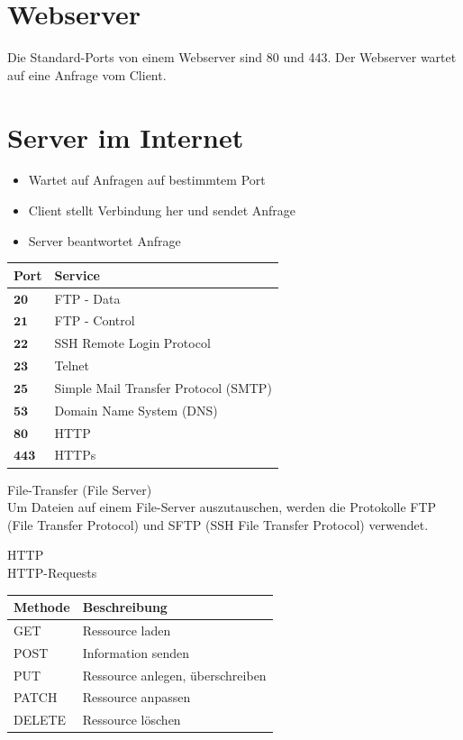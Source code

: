 \documentclass[10pt]{article}
\begin{document}
\section*{Webserver}
Die Standard-Ports von einem Webserver sind 80 und 443. Der Webserver wartet auf eine Anfrage vom Client.

\section*{Server im Internet}
\begin{itemize}
  \item Wartet auf Anfragen auf bestimmtem Port
  \item Client stellt Verbindung her und sendet Anfrage
  \item Server beantwortet Anfrage
\end{itemize}

\begin{center}
\begin{tabular}{|l|l|}
\hline
Port & Service \\
\hline
$\mathbf{2 0}$ & FTP - Data \\
\hline
$\mathbf{2 1}$ & FTP - Control \\
\hline
$\mathbf{2 2}$ & SSH Remote Login Protocol \\
\hline
$\mathbf{2 3}$ & Telnet \\
\hline
$\mathbf{2 5}$ & Simple Mail Transfer Protocol (SMTP) \\
\hline
$\mathbf{5 3}$ & Domain Name System (DNS) \\
\hline
$\mathbf{8 0}$ & HTTP \\
\hline
$\mathbf{4 4 3}$ & HTTPs \\
\hline
\end{tabular}
\end{center}

File-Transfer (File Server)\\
Um Dateien auf einem File-Server auszutauschen, werden die Protokolle FTP (File Transfer Protocol) und SFTP (SSH File Transfer Protocol) verwendet.

HTTP\\
HTTP-Requests

\begin{center}
\begin{tabular}{|l|l|}
\hline
Methode & Beschreibung \\
\hline
GET & Ressource laden \\
\hline
POST & Information senden \\
\hline
PUT & Ressource anlegen, überschreiben \\
\hline
PATCH & Ressource anpassen \\
\hline
DELETE & Ressource löschen \\
\hline
\end{tabular}
\end{center}
\end{document}
